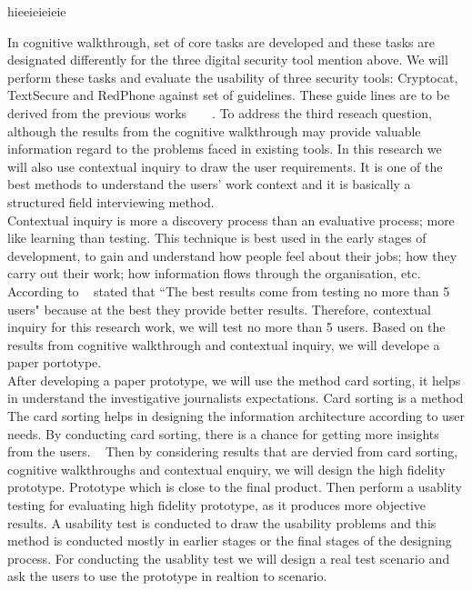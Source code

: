  
 hieeieieieie
 
 In cognitive walkthrough, set of core tasks are developed and these tasks are designated differently for the three digital security tool mention above. We will perform these tasks and evaluate the usability of three security tools: Cryptocat, TextSecure and RedPhone against set of guidelines. These guide lines are to be derived from the previous works~\cite{whitten1999johnny}~\cite{clark2007usability}~\cite{katsabas2005using}~\cite{furnell2006challenges}. To address the third reseach question, although the results from the cognitive walkthrough may provide valuable information regard to the problems faced in existing tools. In this research we will also use contextual inquiry to draw the user requirements. It is one of the best methods to understand the users' work context and it is basically a structured field interviewing method.\\
 
 Contextual inquiry is more a discovery process than an evaluative process; more like learning than testing. This technique is best used in the early stages of development, to gain and understand  how people feel about their jobs; how they carry out their work; how information flows through the organisation, etc.~\cite{1_holtzblatt_2014} According to ~\cite{4nielsen2014} stated that ``The best results come from testing no more than 5 users" because at the best they provide better results. Therefore, contextual inquiry for this research work, we will test no more than 5 users.   Based on the results from cognitive walkthrough and contextual inquiry, we will develope a paper portotype. \\
 
 After developing a paper prototype, we will use the method card sorting,  it helps in understand the investigative journalists expectations. Card sorting is a method The card sorting helps in designing the information architecture according to user needs. By conducting card sorting, there is a chance for getting more insights from the users. 
 ~\cite{2_hudson_2014} Then by considering results that are dervied from card sorting, cognitive walkthroughs and contextual enquiry, we will design the high fidelity prototype. Prototype which is close to the final product. Then perform a usablity testing for evaluating high fidelity prototype, as it produces more objective results. A usability test is conducted to draw the usability problems and this method is conducted mostly in earlier stages or the final stages of the designing process. For conducting the usablity test we will design a real test scenario and ask the users to use the prototype in realtion to scenario. 